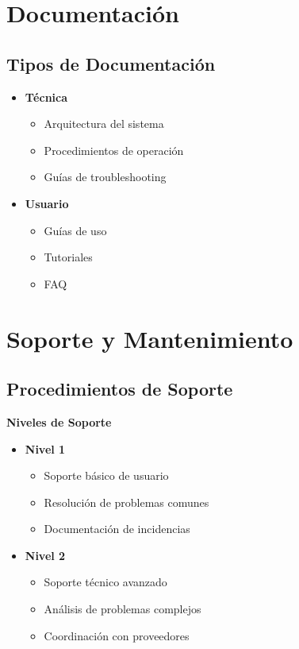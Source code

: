 \section{Documentación}
\subsection{Tipos de Documentación}
\begin{itemize}
    \item \textbf{Técnica}
    \begin{itemize}
        \item Arquitectura del sistema
        \item Procedimientos de operación
        \item Guías de troubleshooting
    \end{itemize}
    \item \textbf{Usuario}
    \begin{itemize}
        \item Guías de uso
        \item Tutoriales
        \item FAQ
    \end{itemize}
\end{itemize}

\section{Soporte y Mantenimiento}
\subsection{Procedimientos de Soporte}
\begin{infocaja}
\textbf{Niveles de Soporte}
\begin{itemize}
    \item \textbf{Nivel 1}
    \begin{itemize}
        \item Soporte básico de usuario
        \item Resolución de problemas comunes
        \item Documentación de incidencias
    \end{itemize}
    \item \textbf{Nivel 2}
    \begin{itemize}
        \item Soporte técnico avanzado
        \item Análisis de problemas complejos
        \item Coordinación con proveedores
    \end{itemize}
\end{itemize}
\end{infocaja}

